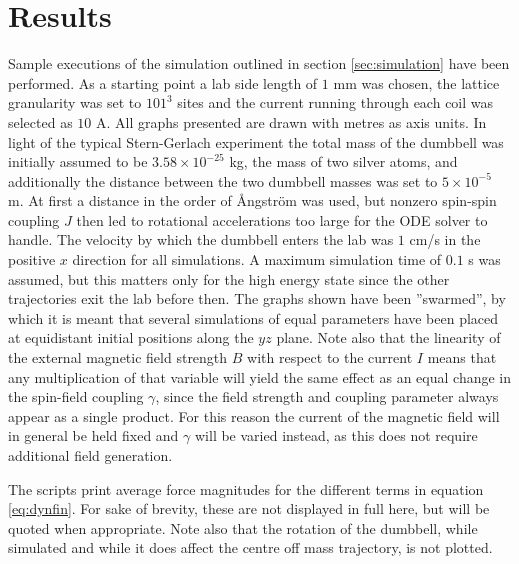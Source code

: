 \documentclass[main.tex]{subfiles}
\begin{document}
\section{Results}
Sample executions of the simulation outlined in section \ref{sec:simulation} have been
performed. As a starting point a lab side length of \(1\) mm was chosen, the lattice
granularity was set to \(101^3\) sites and the current running through each coil was
selected as \(10\) A. All graphs presented are drawn with metres as axis units. In light of the typical Stern-Gerlach experiment the total mass
of the dumbbell was initially assumed to be \(3.58\times 10^{-25}\) kg, the mass of two silver
atoms, and additionally the distance between the two dumbbell masses was set to \(5\times
10^{-5}\) m. At first a distance in the order of Ångström was used, but nonzero
spin-spin coupling \(J\) then led to rotational accelerations too large for the ODE solver
to handle. The velocity by which the dumbbell enters the lab was \(1\) cm/s in the positive
\(x\) direction for all simulations. A maximum simulation time of \(0.1\) s was
assumed, but this matters only for the high energy state
since the other
trajectories exit the lab before then. The graphs shown have been ''swarmed'', by which it
is meant that several simulations of equal parameters have been placed at equidistant
initial positions along the \(yz\) plane. Note also that the linearity of the
external magnetic field strength \(B\) with respect to the current \(I\) means that any multiplication of that
variable will yield the same effect as an equal change in the spin-field coupling
\(\gamma\), since the field strength and coupling parameter always appear as a single product. For this reason the current of the magnetic field will in general be held fixed
and \(\gamma\) will be varied instead, as this does not require additional field
generation.

The scripts print average force magnitudes for the different terms in equation
\ref{eq:dynfin}. For sake of brevity, these are not displayed in full here, but will be
quoted when appropriate. Note also that the rotation of the dumbbell, while simulated and
while it does affect the centre off mass trajectory, is not plotted.
\end{document}
